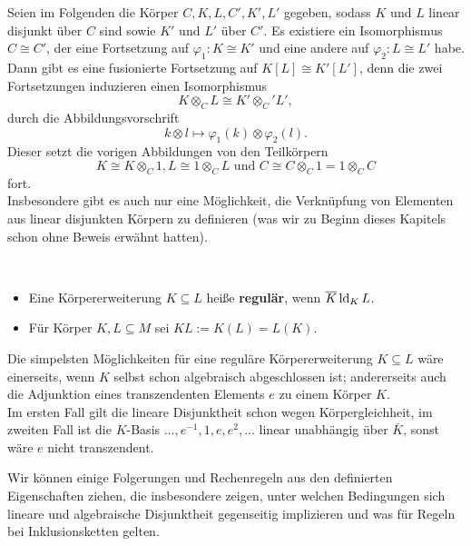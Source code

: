     \begin{corollary}\label{Isomorphismen linear disjunkt}
    	Seien im Folgenden die Körper $C,K,L,C',K',L'$ gegeben, sodass $K$ und $L$ linear disjunkt über $C$ sind sowie $K'$ und $L'$ über $C'$. Es existiere ein Isomorphismus $C\cong C'$, der eine Fortsetzung auf $\varphi_1:K\cong K'$ und eine andere auf $\varphi_2:L\cong L'$ habe. Dann gibt es eine \glqq{}fusionierte\grqq{} Fortsetzung auf $K[L]\cong K'[L']$, denn die zwei Fortsetzungen induzieren einen Isomorphismus $$K\otimes_CL\cong K'\otimes_C'L',$$ durch die Abbildungsvorschrift $$k\otimes l\mapsto\varphi_1(k)\otimes\varphi_2(l).$$
    	Dieser setzt die vorigen Abbildungen von den Teilkörpern $$K\cong K\otimes_C1,L\cong1\otimes_CL\text{ und }C\cong C\otimes_C1=1\otimes_CC$$ fort.\\
    	Insbesondere gibt es auch nur eine Möglichkeit, die Verknüpfung von Elementen aus linear disjunkten Körpern zu definieren (was wir zu Beginn dieses Kapitels schon ohne Beweis erwähnt hatten).
    \end{corollary}
    \newpage
    \begin{definition}
    	\ 
    	\begin{itemize}
    		\item Eine Körpererweiterung $K\subseteq L$ heiße \textbf{regulär}, wenn $\overline{K}\operatorname{ld}_KL$.
    		\item Für Körper $K,L\subseteq M$ sei $KL:=K(L)=L(K)$.
    	\end{itemize}
    \end{definition}
    
    \begin{example}
    	Die simpelsten Möglichkeiten für eine reguläre Körpererweiterung $K\subseteq L$ wäre einerseits, wenn $K$ selbst schon algebraisch abgeschlossen ist; andererseits auch die Adjunktion eines transzendenten Elements $e$ zu einem Körper $K$.\\
    	Im ersten Fall gilt die lineare Disjunktheit schon wegen Körpergleichheit, im zweiten Fall ist die $K$-Basis $\dots,e^{-1},1,e,e^2,\dots$ linear unabhängig über $\overline{K}$, sonst wäre $e$ nicht transzendent.
    \end{example}
    
    Wir können einige Folgerungen und \glqq{}Rechenregeln\grqq{} aus den definierten Eigenschaften ziehen, die insbesondere zeigen, unter welchen Bedingungen sich lineare und algebraische Disjunktheit gegenseitig implizieren und was für Regeln bei Inklusionsketten gelten.
    
